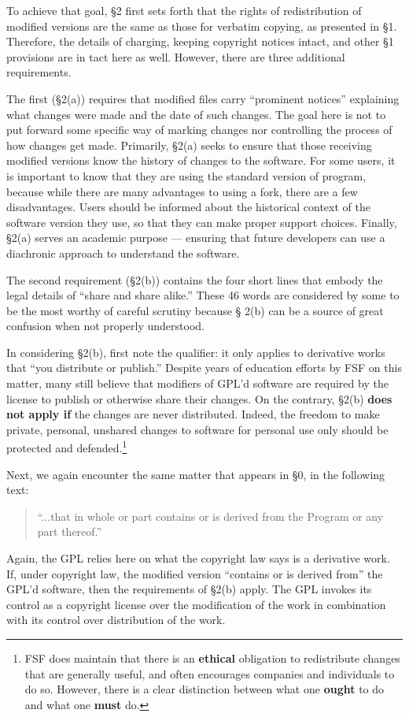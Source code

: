 To achieve that goal, \S 2 first sets forth that the rights of
redistribution of modified versions are the same as those for verbatim
copying, as presented in \S 1. Therefore, the details of charging,
keeping copyright notices intact, and other \S 1 provisions are in tact
here as well. However, there are three additional requirements.

The first (\S 2(a)) requires that modified files carry ``prominent
notices'' explaining what changes were made and the date of such
changes. The goal here is not to put forward some specific way of
marking changes nor controlling the process of how changes get made.
Primarily, \S 2(a) seeks to ensure that those receiving modified
versions know the history of changes to the software. For some users,
it is important to know that they are using the standard version of
program, because while there are many advantages to using a fork,
there are a few disadvantages. Users should be informed about the
historical context of the software version they use, so that they can
make proper support choices. Finally, \S 2(a) serves an academic
purpose --- ensuring that future developers can use a diachronic
approach to understand the software.

\medskip

The second requirement (\S 2(b)) contains the four short lines that embody
the legal details of ``share and share alike.''  These 46 words are
considered by some to be the most worthy of careful scrutiny because \S
2(b) can be a source of great confusion when not properly understood.

In considering \S 2(b), first note the qualifier: it only applies to
derivative works that ``you distribute or publish.''  Despite years of
education efforts by FSF on this matter, many still believe that modifiers
of GPL'd software are required by the license to publish or otherwise
share their changes. On the contrary, \S 2(b) {\bf does not apply if} the
changes are never distributed. Indeed, the freedom to make private,
personal, unshared changes to software for personal use only should be
protected and defended.\footnote{FSF does maintain that there is an {\bf
    ethical} obligation to redistribute changes that are generally useful,
  and often encourages companies and individuals to do so. However, there
  is a clear distinction between what one {\bf ought} to do and what one
  {\bf must} do.}

Next, we again encounter the same matter that appears in \S 0, in the
following text:
\begin{quote}
``...that in whole or part contains or is derived from the Program or any part thereof.''
\end{quote}
Again, the GPL relies here on what the copyright law says is a derivative
work. If, under copyright law, the modified version ``contains or is
derived from'' the GPL'd software, then the requirements of \S 2(b)
apply. The GPL invokes its control as a copyright license over the
modification of the work in combination with its control over distribution
of the work.

